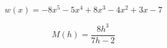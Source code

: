 \documentclass{ximera}
\begin{document}
\begin{example}
\begin{question}
\end{question}












\begin{question}


\[
w(x) = -8x^5 - 5x^4 + 8x^3 - 4x^2 + 3x - 7
\]

\begin{multipleChoice}
\end{multipleChoice}


\end{question}











\begin{question}


\[
M(h) = \frac{ 8h^3}{7h - 2}
\]

\begin{multipleChoice}
\end{multipleChoice}


\end{question}











\end{example}
\end{document}
